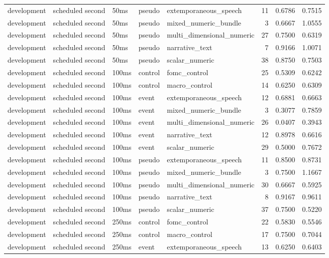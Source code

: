 \begin{tabular}{lllllrrr}
development & scheduled second & 50ms & pseudo & extemporaneous_speech & 11 & 0.6786 & 0.7515 \\
development & scheduled second & 50ms & pseudo & mixed_numeric_bundle & 3 & 0.6667 & 1.0555 \\
development & scheduled second & 50ms & pseudo & multi_dimensional_numeric & 27 & 0.7500 & 0.6319 \\
development & scheduled second & 50ms & pseudo & narrative_text & 7 & 0.9166 & 1.0071 \\
development & scheduled second & 50ms & pseudo & scalar_numeric & 38 & 0.8750 & 0.7503 \\
development & scheduled second & 100ms & control & fomc_control & 25 & 0.5309 & 0.6242 \\
development & scheduled second & 100ms & control & macro_control & 14 & 0.6250 & 0.6309 \\
development & scheduled second & 100ms & event & extemporaneous_speech & 12 & 0.6881 & 0.6663 \\
development & scheduled second & 100ms & event & mixed_numeric_bundle & 3 & 0.3077 & 0.7859 \\
development & scheduled second & 100ms & event & multi_dimensional_numeric & 26 & 0.0407 & 0.3943 \\
development & scheduled second & 100ms & event & narrative_text & 12 & 0.8978 & 0.6616 \\
development & scheduled second & 100ms & event & scalar_numeric & 29 & 0.5000 & 0.7672 \\
development & scheduled second & 100ms & pseudo & extemporaneous_speech & 11 & 0.8500 & 0.8731 \\
development & scheduled second & 100ms & pseudo & mixed_numeric_bundle & 3 & 0.7500 & 1.1667 \\
development & scheduled second & 100ms & pseudo & multi_dimensional_numeric & 30 & 0.6667 & 0.5925 \\
development & scheduled second & 100ms & pseudo & narrative_text & 8 & 0.9167 & 0.9611 \\
development & scheduled second & 100ms & pseudo & scalar_numeric & 37 & 0.7500 & 0.5220 \\
development & scheduled second & 250ms & control & fomc_control & 22 & 0.5830 & 0.5546 \\
development & scheduled second & 250ms & control & macro_control & 17 & 0.7500 & 0.7044 \\
development & scheduled second & 250ms & event & extemporaneous_speech & 13 & 0.6250 & 0.6403 \\

\end{tabular}
